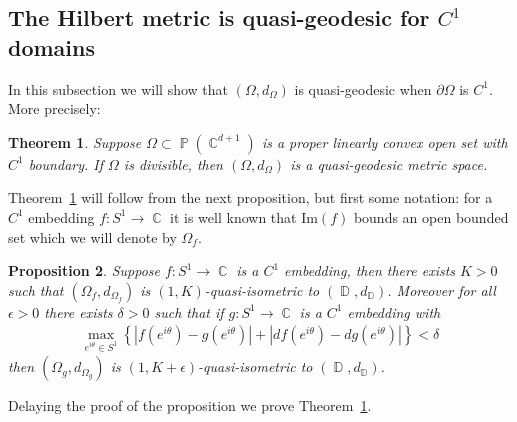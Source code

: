 \documentclass[12pt]{amsart}
\theoremstyle{plain}
\newtheorem{proposition}{Proposition}[section]
\newtheorem{theorem}[proposition]{Theorem}
\theoremstyle{definition}
\theoremstyle{remark}
\begin{document}
\subsection{The Hilbert metric is quasi-geodesic for $C^1$ domains}

In this subsection we will show that $(\Omega,d_{\Omega})$ is quasi-geodesic when $\partial \Omega$ is  $C^1$. More precisely:

\begin{theorem}
\label{thm:quasi_geod}
Suppose $\Omega \subset \operatorname{\mathbb{P}}(\operatorname{\mathbb{C}}^{d+1})$ is a proper linearly convex open set with $C^1$ boundary. If $\Omega$ is divisible, then $(\Omega,d_{\Omega})$ is a quasi-geodesic metric space.
\end{theorem}

Theorem~\ref{thm:quasi_geod} will follow from the next proposition, but first some notation: for a $C^1$ embedding $f: S^1 \rightarrow \operatorname{\mathbb{C}}$ it is well known that $\textrm{Im}(f)$ bounds an open bounded set which we will denote by $\Omega_f$. 

\begin{proposition}
\label{prop:abc}
Suppose $f: S^1 \rightarrow \operatorname{\mathbb{C}}$ is a $C^1$ embedding, then there exists $K>0$ such that $(\Omega_f, d_{\Omega_f})$ is $(1,K)$-quasi-isometric to $(\operatorname{\mathbb{D}},d_\operatorname{\mathbb{D}})$. Moreover for all $\epsilon >0$ there exists $\delta >0$ such that if $g: S^1 \rightarrow \operatorname{\mathbb{C}}$ is a $C^1$ embedding with
\begin{align*}
\max_{e^{i\theta} \in S^1} \left\{ {\left|{ f(e^{i\theta})-g(e^{i\theta})}\right|} + {\left|{ df(e^{i\theta})-d
g(e^{i\theta})}\right|} \right\} < \delta
\end{align*}
then $(\Omega_{g}, d_{\Omega_{g}})$ is $(1,K+\epsilon)$-quasi-isometric to $(\operatorname{\mathbb{D}},d_\operatorname{\mathbb{D}})$. 
\end{proposition}

Delaying the proof of the proposition we prove Theorem~\ref{thm:quasi_geod}.
\end{document}
